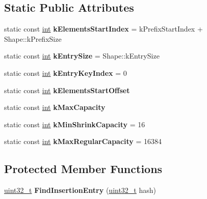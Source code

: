 \subsection*{Static Public Attributes}
\begin{DoxyCompactItemize}
\item 
\mbox{\label{classv8_1_1internal_1_1HashTable_a8aa6d7d9275d3593ea48c4c4e4f90b9d}} 
static const \mbox{\hyperlink{classint}{int}} {\bfseries k\+Elements\+Start\+Index} = k\+Prefix\+Start\+Index + Shape\+::k\+Prefix\+Size
\item 
\mbox{\label{classv8_1_1internal_1_1HashTable_a084a957331c276380859e1489c618e37}} 
static const \mbox{\hyperlink{classint}{int}} {\bfseries k\+Entry\+Size} = Shape\+::k\+Entry\+Size
\item 
\mbox{\label{classv8_1_1internal_1_1HashTable_a7cfa76519d280b5ab11cca9a96ad8a72}} 
static const \mbox{\hyperlink{classint}{int}} {\bfseries k\+Entry\+Key\+Index} = 0
\item 
static const \mbox{\hyperlink{classint}{int}} {\bfseries k\+Elements\+Start\+Offset}
\item 
static const \mbox{\hyperlink{classint}{int}} {\bfseries k\+Max\+Capacity}
\item 
\mbox{\label{classv8_1_1internal_1_1HashTable_a29544e77304de983c24cf9498f4f0879}} 
static const \mbox{\hyperlink{classint}{int}} {\bfseries k\+Min\+Shrink\+Capacity} = 16
\item 
\mbox{\label{classv8_1_1internal_1_1HashTable_a85642aaddc6eba9626b26d601ce85770}} 
static const \mbox{\hyperlink{classint}{int}} {\bfseries k\+Max\+Regular\+Capacity} = 16384
\end{DoxyCompactItemize}
\subsection*{Protected Member Functions}
\begin{DoxyCompactItemize}
\item 
\mbox{\label{classv8_1_1internal_1_1HashTable_aef477d2f3eb85d49ed567615b253e385}} 
\mbox{\hyperlink{classuint32__t}{uint32\+\_\+t}} {\bfseries Find\+Insertion\+Entry} (\mbox{\hyperlink{classuint32__t}{uint32\+\_\+t}} hash)
\end{DoxyCompactItemize}
